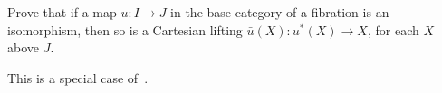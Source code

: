 \begin{exercise}
Prove that if a map \(u : I \to J\) in the base category of a fibration is an isomorphism, then so is a Cartesian lifting \(\bar{u}(X) : u^*(X) \to X\), for each \(X\) above \(J\).
\end{exercise}

\begin{solution}
This is a special case of~.
\end{solution}
